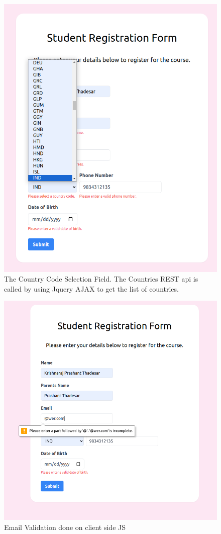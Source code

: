\documentclass[11pt]{article}
\begin{document}
\begin{figure}[H]
    \centering
    \includegraphics[width=.95\textwidth]{03.png}
    \caption{The Country Code Selection Field. The Countries REST api is called by using Jquery AJAX to get the list of countries. }
\end{figure}

\begin{figure}[H]
    \centering
    \includegraphics[width=.95\textwidth]{04.png}
    \caption{Email Validation done on client side JS}
\end{figure}
\end{document}
